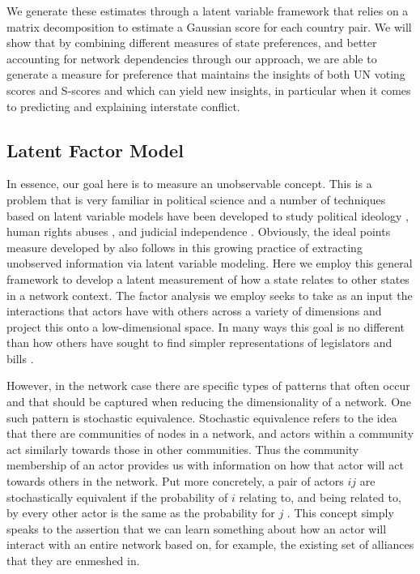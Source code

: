 We generate these estimates through a latent variable framework that relies on a matrix decomposition to estimate a Gaussian score for each country pair. We will show that by combining different measures of state preferences, and better accounting for network dependencies through our approach, we are able to generate a measure for preference that maintains the insights of both UN voting scores and S-scores and which can yield new insights, in particular when it comes to predicting and explaining interstate conflict.

\subsection*{Latent Factor Model}

In essence, our goal here is to measure an unobservable concept. This is a problem that is very familiar in political science and a number of techniques based on latent variable models have been developed to study political ideology \citep{martin:quinn:2002,konig:etal:2013}, human rights abuses \citep{fariss:2014}, and judicial independence \citep{linzer:staton:2015}. Obviously, the ideal points measure developed by \citet{bailey:etal:2015} also follows in this growing practice of extracting unobserved information via latent variable modeling. Here we employ this general framework to develop a latent measurement of how a state relates to other states in a network context. The factor analysis we employ seeks to take as an input the interactions that actors have with others across a variety of dimensions and project this onto a low-dimensional space. In many ways this goal is no different than how others have sought to find simpler representations of legislators and bills \citep{poole:rosenthal:1985,clinton:etal:2004}.

However, in the network case there are specific types of patterns that often occur and that should be captured when reducing the dimensionality of a network. One such pattern is stochastic equivalence. Stochastic equivalence refers to the idea that there are communities of nodes in a network, and actors within a community act similarly towards those in other communities. Thus the community membership of an actor provides us with information on how that actor will act towards others in the network. Put more concretely, a pair of actors $ij$ are stochastically equivalent if the probability of $i$ relating to, and being related to, by every other actor is the same as the probability for $j$ \citep{anderson:etal:1992}. This concept simply speaks to the assertion that we can learn something about how an actor will interact with an entire network based on, for example, the existing set of alliances that they are enmeshed in.

